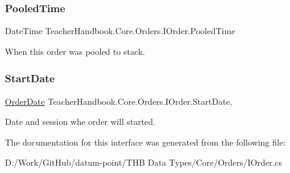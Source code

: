 \subsubsection{\texorpdfstring{Pooled\+Time}{PooledTime}}
{\footnotesize\ttfamily Date\+Time Teacher\+Handbook.\+Core.\+Orders.\+I\+Order.\+Pooled\+Time\hspace{0.3cm}{\ttfamily [get]}}



When this order was pooled to stack. 

\mbox{\label{interface_teacher_handbook_1_1_core_1_1_orders_1_1_i_order_a095dc6b1b492dee172826971fa7ec0b2}} 
\subsubsection{\texorpdfstring{Start\+Date}{StartDate}}
{\footnotesize\ttfamily \mbox{\hyperlink{struct_teacher_handbook_1_1_core_1_1_orders_1_1_order_date}{Order\+Date}} Teacher\+Handbook.\+Core.\+Orders.\+I\+Order.\+Start\+Date\hspace{0.3cm}{\ttfamily [get]}, {\ttfamily [set]}}



Date and session whe order will started. 



The documentation for this interface was generated from the following file\+:\begin{DoxyCompactItemize}
\item 
D\+:/\+Work/\+Git\+Hub/datum-\/point/\+T\+H\+B Data Types/\+Core/\+Orders/I\+Order.\+cs\end{DoxyCompactItemize}
